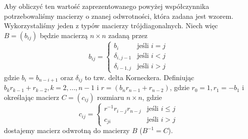 Aby obliczyć ten wartość zaprezentowanego powyżej współczynnika potrzebowaliśmy macierzy o znanej odwrotności, która zadana jest wzorem. Wykorzystaliśmy jeden z typów macierzy trójdiagonalnych. Niech więc $B = (b_{ij})$ będzie macierzą $n \times n$ zadaną przez
$$b_{ij} = \left\{\begin{matrix}b_i & \mbox{jeśli } i=j \\\delta_{i, j-1} & \mbox{jeśli } i<j \\\delta_{i-1,j} & \mbox{jeśli } i>j \end{matrix}\right.$$
gdzie $b_i=b_{n-i+1}$ oraz $\delta_{ij}$ to tzw. delta Korneckera. Definiując
$b_kr_{k-1}+r_{k-2}, k = 2, ... , n-1$ i $r=(b_nr_{n-1}+r_{n-2})$, gdzie
$r_0=1, r_1=-b_1$ i określając macierz $C=(c_{ij})$ rozmiaru $n \times n$, gdzie
$$c_{ij} = \left\{\begin{matrix}r^{-1}r_{i-j}r_{n-j} & \mbox{jeśli } i \leq j  \\c_{ji} & \mbox{jeśli } i > j \end{matrix}\right.$$
dostajemy macierz odwrotną do macierzy $B$ ($B^{-1}=C$).

